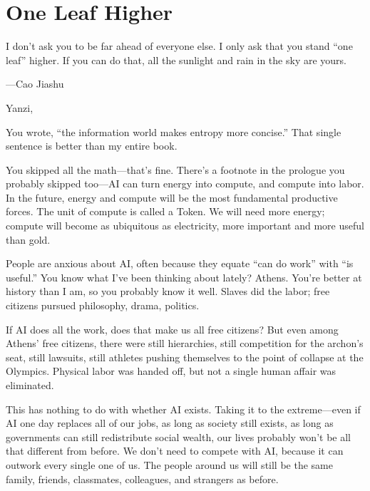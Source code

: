 



\newpage
\section*{One Leaf Higher}

\begin{myquote}
I don't ask you to be far ahead of everyone else. I only ask that you stand ``one leaf'' higher. If you can do that, all the sunlight and rain in the sky are yours.

\hfill ---Cao Jiashu
\end{myquote}

\vspace{1em}

Yanzi,

You wrote, ``the information world makes entropy more concise.'' That single sentence is better than my entire book.

You skipped all the math---that's fine. There's a footnote in the prologue you probably skipped too---AI can turn energy into compute, and compute into labor. In the future, energy and compute will be the most fundamental productive forces. The unit of compute is called a Token. We will need more energy; compute will become as ubiquitous as electricity, more important and more useful than gold.

\vspace{1em}

People are anxious about AI, often because they equate ``can do work'' with ``is useful.''
You know what I've been thinking about lately? Athens. You're better at history than I am, so you probably know it well. Slaves did the labor; free citizens pursued philosophy, drama, politics.

\vspace{1em}

If AI does all the work, does that make us all free citizens?
But even among Athens' free citizens, there were still hierarchies, still competition for the archon's seat, still lawsuits, still athletes pushing themselves to the point of collapse at the Olympics. Physical labor was handed off, but not a single human affair was eliminated.

\vspace{1em}

This has nothing to do with whether AI exists. Taking it to the extreme---even if AI one day replaces all of our jobs, as long as society still exists, as long as governments can still redistribute social wealth, our lives probably won't be all that different from before. We don't need to compete with AI, because it can outwork every single one of us. The people around us will still be the same family, friends, classmates, colleagues, and strangers as before.

